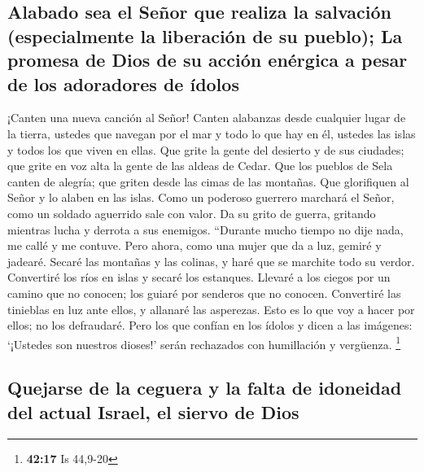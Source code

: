 \hypertarget{alabado-sea-el-seuxf1or-que-realiza-la-salvaciuxf3n-especialmente-la-liberaciuxf3n-de-su-pueblo-la-promesa-de-dios-de-su-acciuxf3n-enuxe9rgica-a-pesar-de-los-adoradores-de-uxeddolos}{%
\subsection{Alabado sea el Señor que realiza la salvación (especialmente
la liberación de su pueblo); La promesa de Dios de su acción enérgica a
pesar de los adoradores de
ídolos}\label{alabado-sea-el-seuxf1or-que-realiza-la-salvaciuxf3n-especialmente-la-liberaciuxf3n-de-su-pueblo-la-promesa-de-dios-de-su-acciuxf3n-enuxe9rgica-a-pesar-de-los-adoradores-de-uxeddolos}}

 ¡Canten una nueva canción al Señor! Canten alabanzas
desde cualquier lugar de la tierra, ustedes que navegan por el mar y
todo lo que hay en él, ustedes las islas y todos los que viven en ellas.
 Que grite la gente del desierto y de sus ciudades; que
grite en voz alta la gente de las aldeas de Cedar. Que los pueblos de
Sela canten de alegría; que griten desde las cimas de las montañas.
 Que glorifiquen al Señor y lo alaben en las islas.
 Como un poderoso guerrero marchará el Señor, como un
soldado aguerrido sale con valor. Da su grito de guerra, gritando
mientras lucha y derrota a sus enemigos.  ``Durante mucho
tiempo no dije nada, me callé y me contuve. Pero ahora, como una mujer
que da a luz, gemiré y jadearé.  Secaré las montañas y
las colinas, y haré que se marchite todo su verdor. Convertiré los ríos
en islas y secaré los estanques.  Llevaré a los ciegos
por un camino que no conocen; los guiaré por senderos que no conocen.
Convertiré las tinieblas en luz ante ellos, y allanaré las asperezas.
Esto es lo que voy a hacer por ellos; no los defraudaré. 
Pero los que confían en los ídolos y dicen a las imágenes: `¡Ustedes son
nuestros dioses!' serán rechazados con humillación y vergüenza.
\footnote{\textbf{42:17} Is 44,9-20}

\hypertarget{quejarse-de-la-ceguera-y-la-falta-de-idoneidad-del-actual-israel-el-siervo-de-dios}{%
\subsection{Quejarse de la ceguera y la falta de idoneidad del actual
Israel, el siervo de
Dios}\label{quejarse-de-la-ceguera-y-la-falta-de-idoneidad-del-actual-israel-el-siervo-de-dios}}

